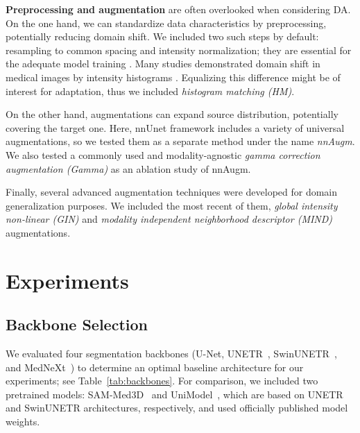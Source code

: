 \textbf{Preprocessing and augmentation} are often overlooked when considering DA. On the one hand, we can standardize data characteristics by preprocessing, potentially reducing domain shift. We included two such steps by default: resampling to common spacing and intensity normalization; they are essential for the adequate model training \cite{kondrateva2022negligible}. Many studies demonstrated domain shift in medical images by intensity histograms \cite{crossmoda,se_medim,vasiliuk2023limitations}. Equalizing this difference might be of interest for adaptation, thus we included \textit{histogram matching (HM)}.

On the other hand, augmentations can expand source distribution, potentially covering the target one. Here, nnUnet framework \cite{nnunet} includes a variety of universal augmentations, so we tested them as a separate method under the name \textit{nnAugm}. We also tested a commonly used and modality-agnostic \textit{gamma correction augmentation (Gamma)} as an ablation study of nnAugm.

Finally, several advanced augmentation techniques were developed for domain generalization purposes. We included the most recent of them, \textit{global intensity non-linear (GIN)} \cite{gin} and \textit{modality independent neighborhood descriptor (MIND)} \cite{dg_tta} augmentations.



\section{Experiments}


\subsection{Backbone Selection}

We evaluated four segmentation backbones (U-Net, UNETR~\cite{unetr}, SwinUNETR~\cite{swinunetr}, and MedNeXt~\cite{mednext}) to determine an optimal baseline architecture for our experiments; see Table~\ref{tab:backbones}. For comparison, we included two pretrained models: SAM-Med3D~\cite{sammed} and UniModel~\cite{unimodel}, which are based on UNETR and SwinUNETR architectures, respectively, and used officially published model weights.



